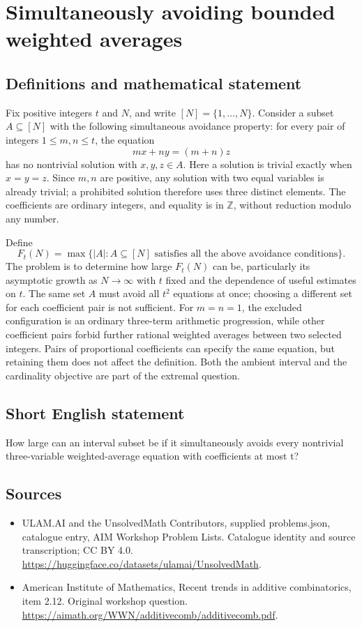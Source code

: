 \documentclass[11pt,a4paper]{article}
\begin{document}
\section*{Simultaneously avoiding bounded weighted averages}\label{statement}

\subsection{Definitions and mathematical statement}
Fix positive integers $t$ and $N$, and write $[N]=\{1,\ldots,N\}$.
Consider a subset $A\subseteq[N]$ with the following simultaneous
avoidance property: for every pair of integers $1\le m,n\le t$,
the equation
\[
                              mx+ny=(m+n)z
\]
has no nontrivial solution with $x,y,z\in A$. Here a solution is
trivial exactly when $x=y=z$. Since $m,n$ are positive, any solution
with two equal variables is already trivial; a prohibited solution
therefore uses three distinct elements. The coefficients are ordinary
integers, and equality is in $\mathbb Z$, without reduction modulo
any number.

Define
\[
 F_t(N)=\max\{|A|:A\subseteq[N]\text{ satisfies all the above
                                          avoidance conditions}\}.
\]
The problem is to determine how large $F_t(N)$ can be, particularly
its asymptotic growth as $N\to\infty$ with $t$ fixed and the dependence
of useful estimates on $t$.
The same set $A$ must avoid all $t^2$ equations at once; choosing
a different set for each coefficient pair is not sufficient.
For $m=n=1$, the excluded configuration is an ordinary three-term
arithmetic progression, while other coefficient pairs forbid further
rational weighted averages between two selected integers. Pairs of
proportional coefficients can specify the same equation, but retaining
them does not affect the definition. Both the ambient interval and
the cardinality objective are part of the extremal question.
\subsection{Short English statement}
How large can an interval subset be if it simultaneously avoids every nontrivial three-variable weighted-average equation with coefficients at most t?
\subsection{Sources}
\begin{itemize}
\item[S1] ULAM.AI and the UnsolvedMath Contributors, supplied problems.json, catalogue entry, AIM Workshop Problem Lists. Catalogue identity and source transcription; CC BY 4.0.
\url{https://huggingface.co/datasets/ulamai/UnsolvedMath}.
\item[S2] American Institute of Mathematics, Recent trends in additive combinatorics, item 2.12. Original workshop question.
\url{https://aimath.org/WWN/additivecomb/additivecomb.pdf}.
\end{itemize}
\end{document}
